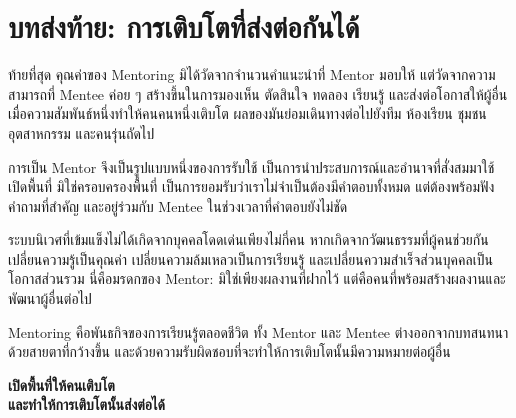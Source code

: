 \backmatter
\chapter*{บทส่งท้าย: การเติบโตที่ส่งต่อกันได้}

ท้ายที่สุด คุณค่าของ Mentoring มิได้วัดจากจำนวนคำแนะนำที่ Mentor มอบให้ แต่วัดจากความสามารถที่ Mentee ค่อย ๆ สร้างขึ้นในการมองเห็น ตัดสินใจ ทดลอง เรียนรู้ และส่งต่อโอกาสให้ผู้อื่น เมื่อความสัมพันธ์หนึ่งทำให้คนคนหนึ่งเติบโต ผลของมันย่อมเดินทางต่อไปยังทีม ห้องเรียน ชุมชน อุตสาหกรรม และคนรุ่นถัดไป

การเป็น Mentor จึงเป็นรูปแบบหนึ่งของการรับใช้ เป็นการนำประสบการณ์และอำนาจที่สั่งสมมาใช้เปิดพื้นที่ มิใช่ครอบครองพื้นที่ เป็นการยอมรับว่าเราไม่จำเป็นต้องมีคำตอบทั้งหมด แต่ต้องพร้อมฟังคำถามที่สำคัญ และอยู่ร่วมกับ Mentee ในช่วงเวลาที่คำตอบยังไม่ชัด

ระบบนิเวศที่เข้มแข็งไม่ได้เกิดจากบุคคลโดดเด่นเพียงไม่กี่คน หากเกิดจากวัฒนธรรมที่ผู้คนช่วยกันเปลี่ยนความรู้เป็นคุณค่า เปลี่ยนความล้มเหลวเป็นการเรียนรู้ และเปลี่ยนความสำเร็จส่วนบุคคลเป็นโอกาสส่วนรวม นี่คือมรดกของ Mentor: มิใช่เพียงผลงานที่ฝากไว้ แต่คือคนที่พร้อมสร้างผลงานและพัฒนาผู้อื่นต่อไป

\begin{keytakeaway}
Mentoring คือพันธกิจของการเรียนรู้ตลอดชีวิต ทั้ง Mentor และ Mentee ต่างออกจากบทสนทนาด้วยสายตาที่กว้างขึ้น และด้วยความรับผิดชอบที่จะทำให้การเติบโตนั้นมีความหมายต่อผู้อื่น
\end{keytakeaway}

\vfill
\begin{center}
\color{BlueprintNavy}\Large\bfseries
เปิดพื้นที่ให้คนเติบโต\\
และทำให้การเติบโตนั้นส่งต่อได้
\end{center}
